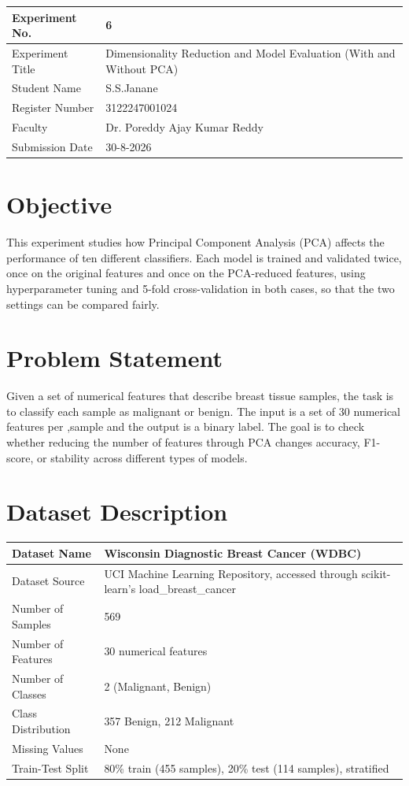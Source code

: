 \documentclass[12pt,a4paper]{article}
\begin{document}
\begin{tabular}{|p{4cm}|p{11cm}|}
\hline
Experiment No. & 6 \\ \hline
Experiment Title & Dimensionality Reduction and Model Evaluation (With and Without PCA)\\ \hline
Student Name & S.S.Janane\\ \hline
Register Number & 3122247001024 \\ \hline
Faculty & Dr. Poreddy Ajay Kumar Reddy \\ \hline
Submission Date & 30-8-2026\\ \hline
\end{tabular}

\section{Objective}
This experiment studies how Principal Component Analysis (PCA) affects the performance of ten different classifiers. Each model is trained and validated twice, once on the original features and once on the PCA-reduced features, using hyperparameter tuning and 5-fold cross-validation in both cases, so that the two settings can be compared fairly.

\section{Problem Statement}
Given a set of numerical features that describe breast tissue samples, the task is to classify each sample as malignant or benign. The input is a set of 30 numerical features per ,sample and the output is a binary label. The goal is to check whether reducing the number of features through PCA changes accuracy, F1-score, or stability across different types of models.

\section{Dataset Description}
\begin{longtable}{|p{6cm}|p{8cm}|}
\hline
Dataset Name & Wisconsin Diagnostic Breast Cancer (WDBC) \\ \hline
Dataset Source & UCI Machine Learning Repository, accessed through scikit-learn's load\_breast\_cancer \\ \hline
Number of Samples & 569 \\ \hline
Number of Features & 30 numerical features \\ \hline
Number of Classes & 2 (Malignant, Benign) \\ \hline
Class Distribution & 357 Benign, 212 Malignant \\ \hline
Missing Values & None \\ \hline
Train-Test Split & 80\% train (455 samples), 20\% test (114 samples), stratified \\ \hline
\end{longtable}
\end{document}
